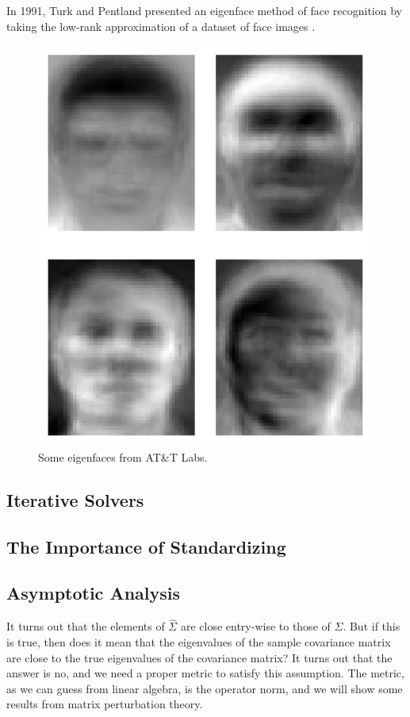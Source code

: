   \begin{example}[Eigenfaces]
    In 1991, Turk and Pentland presented an eigenface method of face recognition by taking the low-rank approximation of a dataset of face images \cite{1991turk}. 

    \begin{figure}[H]
      \centering 
      \includegraphics[scale=0.3]{img/eigenfaces.png}
      \caption{Some eigenfaces from AT\&T Labs. } 
      \label{fig:eigenfaces}
    \end{figure}
  \end{example}

\subsection{Iterative Solvers}

\subsection{The Importance of Standardizing}

\subsection{Asymptotic Analysis}

  It turns out that the elements of $\hat{\Sigma}$ are close entry-wise to those of $\Sigma$. But if this is true, then does it mean that the eigenvalues of the sample covariance matrix are close to the true eigenvalues of the covariance matrix? It turns out that the answer is no, and we need a proper metric to satisfy this assumption. The metric, as we can guess from linear algebra, is the operator norm, and we will show some results from matrix perturbation theory. 

